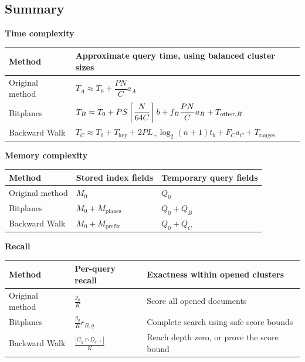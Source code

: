 \subsection{Summary}
\textbf{Time complexity}\par
{\small
\begin{tabularx}{\linewidth}{@{}lY@{}}\toprule
Method & Approximate query time, using balanced cluster sizes\\\midrule
Original method & $T_A\approx T_0+\dfrac{PN}{C}a_A$\\[4pt]
Bitplanes & $T_B\approx T_0+PS\left\lceil \dfrac{N}{64C}\right\rceil b+f_B\dfrac{PN}{C}a_B+T_{\mathrm{other},B}$\\[6pt]
Backward Walk & $T_C\approx T_0+T_{\mathrm{key}}+2PL_+\log_2(n+1)t_b+F_Ca_C+T_{\mathrm{ranges}}$\\\bottomrule
\end{tabularx}\par}\vspace{5pt}

\textbf{Memory complexity}\par
{\small
\begin{tabularx}{\linewidth}{@{}lYY@{}}\toprule
Method & Stored index fields & Temporary query fields\\\midrule
Original method & $M_0$ & $Q_0$\\
Bitplanes & $M_0+M_{\mathrm{planes}}$ & $Q_0+Q_B$\\
Backward Walk & $M_0+M_{\mathrm{prefix}}$ & $Q_0+Q_C$\\\bottomrule
\end{tabularx}\par}\vspace{5pt}

\textbf{Recall}\par
{\small
\begin{tabularx}{\linewidth}{@{}lYY@{}}\toprule
Method & Per-query recall & Exactness within opened clusters\\\midrule
Original method & $\displaystyle\frac{g_q}{K}$ & Score all opened documents\\[3pt]
Bitplanes & $\displaystyle\frac{g_q}{K}r_{B,q}$ & Complete search using safe score bounds\\[3pt]
Backward Walk & $\displaystyle\frac{|G_q\cap D_{q,\ell}|}{K}$ & Reach depth zero, or prove the score bound\\\bottomrule
\end{tabularx}\par}\vspace{5pt}

